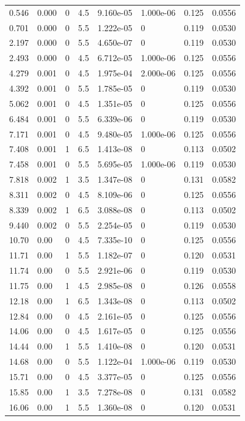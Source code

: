 \documentclass[preview]{standalone}
\begin{document}
{{\begin{tabular}{L{1.2cm}C{1.2cm} C{0.3cm}C{0.5cm} C{1.4cm}C{1.4cm} C{1.4cm}C{1.4cm}}
  0.546  &  0.000  & 0     & 4.5 &  9.160e-05  & 1.000e-06  & 0.125 &  0.0556   \\ 
  0.701  &  0.000  & 0     & 5.5 &  1.222e-05  & 0  & 0.119 &  0.0530   \\ 
  2.197  &  0.000  & 0     & 5.5 &  4.650e-07  & 0  & 0.119 &  0.0530   \\ 
  2.493  &  0.000  & 0     & 4.5 &  6.712e-05  & 1.000e-06  & 0.125 &  0.0556   \\ 
  4.279  &  0.001  & 0     & 4.5 &  1.975e-04  & 2.000e-06  & 0.125 &  0.0556   \\ 
  4.392  &  0.001  & 0     & 5.5 &  1.785e-05  & 0  & 0.119 &  0.0530   \\ 
  5.062  &  0.001  & 0     & 4.5 &  1.351e-05  & 0  & 0.125 &  0.0556   \\ 
  6.484  &  0.001  & 0     & 5.5 &  6.339e-06  & 0  & 0.119 &  0.0530   \\ 
  7.171  &  0.001  & 0     & 4.5 &  9.480e-05  & 1.000e-06  & 0.125 &  0.0556   \\ 
  7.408  &  0.001  & 1     & 6.5 &  1.413e-08  & 0  & 0.113 &  0.0502   \\ 
  7.458  &  0.001  & 0     & 5.5 &  5.695e-05  & 1.000e-06  & 0.119 &  0.0530   \\ 
  7.818  &  0.002  & 1     & 3.5 &  1.347e-08  & 0  & 0.131 &  0.0582   \\ 
  8.311  &  0.002  & 0     & 4.5 &  8.109e-06  & 0  & 0.125 &  0.0556   \\ 
  8.339  &  0.002  & 1     & 6.5 &  3.088e-08  & 0  & 0.113 &  0.0502   \\ 
  9.440  &  0.002  & 0     & 5.5 &  2.254e-05  & 0  & 0.119 &  0.0530   \\ 
  10.70  &  0.00  & 0     & 4.5 &  7.335e-10  & 0  & 0.125 &  0.0556   \\ 
  11.71  &  0.00  & 1     & 5.5 &  1.182e-07  & 0  & 0.120 &  0.0531   \\ 
  11.74  &  0.00  & 0     & 5.5 &  2.921e-06  & 0  & 0.119 &  0.0530   \\ 
  11.75  &  0.00  & 1     & 4.5 &  2.985e-08  & 0  & 0.126 &  0.0558   \\ 
  12.18  &  0.00  & 1     & 6.5 &  1.343e-08  & 0  & 0.113 &  0.0502   \\ 
  12.84  &  0.00  & 0     & 4.5 &  2.161e-05  & 0  & 0.125 &  0.0556   \\ 
  14.06  &  0.00  & 0     & 4.5 &  1.617e-05  & 0  & 0.125 &  0.0556   \\ 
  14.44  &  0.00  & 1     & 5.5 &  1.410e-08  & 0  & 0.120 &  0.0531   \\ 
  14.68  &  0.00  & 0     & 5.5 &  1.122e-04  & 1.000e-06  & 0.119 &  0.0530   \\ 
  15.71  &  0.00  & 0     & 4.5 &  3.377e-05  & 0  & 0.125 &  0.0556   \\ 
  15.85  &  0.00  & 1     & 3.5 &  7.278e-08  & 0  & 0.131 &  0.0582   \\ 
  16.06  &  0.00  & 1     & 5.5 &  1.360e-08  & 0  & 0.120 &  0.0531   \\ 
\hline 
\end{tabular} 

}}
\end{document}
